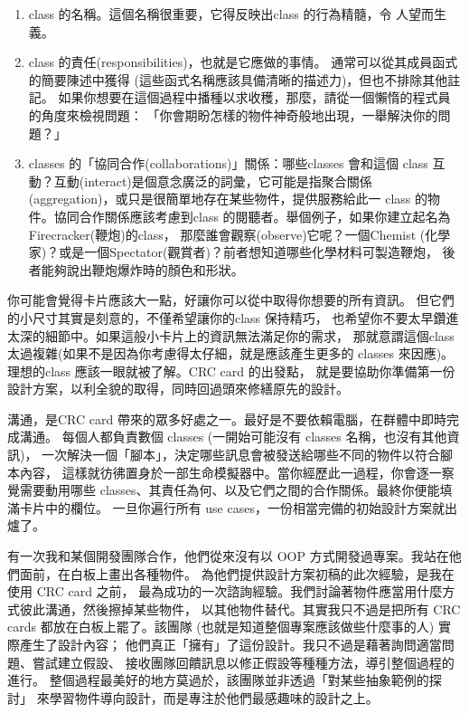 \begin{enumerate}
\item class 的名稱。這個名稱很重要，它得反映出class 的行為精髓，令
人望而生義。
\item class  的責任(responsibilities)，也就是它應做的事情。
通常可以從其成員函式的簡要陳述中獲得
(這些函式名稱應該具備清晰的描述力)，但也不排除其他註記。
如果你想要在這個過程中播種以求收穫，那麼，請從一個懶惰的程式員的角度來檢視問題：
「你會期盼怎樣的物件神奇般地出現，一舉解決你的問題？」
\item classes 的「協同合作(collaborations)」關係：哪些classes 會和這個
class 互動？互動(interact)是個意念廣泛的詞彙，它可能是指聚合關係
(aggregation)，或只是很簡單地存在某些物件，提供服務給此一
class 的物件。協同合作關係應該考慮到class 的閱聽者。舉個例子，如果你建立起名為
Firecracker(鞭炮)的class， 那麼誰會觀察(observe)它呢？一個Chemist
(化學家)？或是一個Spectator(觀賞者)？前者想知道哪些化學材料可製造鞭炮，
後者能夠說出鞭炮爆炸時的顏色和形狀。
\end{enumerate}


\bigskip

你可能會覺得卡片應該大一點，好讓你可以從中取得你想要的所有資訊。
但它們的小尺寸其實是刻意的，不僅希望讓你的class 保持精巧，
也希望你不要太早鑽進太深的細節中。如果這般小卡片上的資訊無法滿足你的需求，
那就意謂這個class 太過複雜(如果不是因為你考慮得太仔細，就是應該產生更多的
classes 來因應)。理想的class 應該一眼就被了解。CRC card 的出發點，
就是要協助你準備第一份設計方案，以利全貌的取得，同時回過頭來修繕原先的設計。

溝通，是CRC card 帶來的眾多好處之一。最好是不要依賴電腦，在群體中即時完成溝通。
每個人都負責數個 classes (一開始可能沒有 classes 名稱，也沒有其他資訊)，
一次解決一個「腳本」，決定哪些訊息會被發送給哪些不同的物件以符合腳本內容，
這樣就彷彿置身於一部生命模擬器中。當你經歷此一過程，你會逐一察覺需要動用哪些
classes、其責任為何、以及它們之間的合作關係。最終你便能填滿卡片中的欄位。
一旦你遍行所有 use cases，一份相當完備的初始設計方案就出爐了。

有一次我和某個開發團隊合作，他們從來沒有以
OOP 方式開發過專案。我站在他們面前，在白板上畫出各種物件。
為他們提供設計方案初稿的此次經驗，是我在使用 CRC card 之前，
最為成功的一次諮詢經驗。我們討論著物件應當用什麼方式彼此溝通，然後擦掉某些物件，
以其他物件替代。其實我只不過是把所有 CRC cards 都放在白板上罷了。該團隊
(也就是知道整個專案應該做些什麼事的人) 實際產生了設計內容；
他們真正「擁有」了這份設計。我只不過是藉著詢問適當問題、嘗試建立假設、
接收團隊回饋訊息以修正假設等種種方法，導引整個過程的進行。
整個過程最美好的地方莫過於，該團隊並非透過「對某些抽象範例的探討」
來學習物件導向設計，而是專注於他們最感趣味的設計之上。

